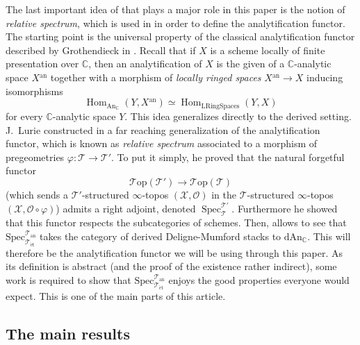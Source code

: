 \documentclass[12pt,a4paper,reqno]{amsart}
\theoremstyle{plain}
\theoremstyle{definition}
\theoremstyle{remark}
\numberwithin{equation}{section}
\begin{document}
The last important idea of \cite{DAG-V} that plays a major role in this paper is the notion of \emph{relative spectrum}, which is used in \cite[Remark 12.26]{DAG-IX} in order to define the analytification functor.
The starting point is the universal property of the classical analytification functor described by Grothendieck in \cite[Expos\'e XII]{SGA1}. Recall that if $X$ is a scheme locally of finite presentation over $\mathbb C$, then an analytification of $X$ is the given of a {$\mathbb C$-analytic\xspace} space $X{^\mathrm{an}}$ together with a morphism of \emph{locally ringed spaces} $X{^\mathrm{an}} \to X$ inducing isomorphisms
\[ \operatorname{Hom}_{{\mathrm{An}_{{\mathbb C}}}}(Y, X{^\mathrm{an}}) \simeq \operatorname{Hom}_{\mathrm{LRingSpaces}}(Y,X)  \]
for every {$\mathbb C$-analytic\xspace} space $Y$.
This idea generalizes directly to the derived setting.
J.\ Lurie constructed in \cite[Theorem 2.1.1]{DAG-V} a far reaching generalization of the analytification functor, which is known as \emph{relative spectrum} associated to a morphism of pregeometries $\varphi \colon {\mathcal T} \to {\mathcal T}'$. To put it simply, he proved that the natural forgetful functor
\[ {\mathcal T\mathrm{op}}({\mathcal T}') \to {\mathcal T\mathrm{op}}({\mathcal T}) \]
(which sends a ${\mathcal T}'$-structured $\infty$-topos $({\mathcal X}, {\mathcal O})$ in the ${\mathcal T}$-structured $\infty$-topos $({\mathcal X}, {\mathcal O} \circ \varphi)$) admits a right adjoint, denoted $\operatorname{Spec}^{{\mathcal T}'}_{\mathcal T}$.
Furthermore he showed that this functor respects the subcategories of schemes.
Then, \cite[Corollary 12.22]{DAG-IX} allows to see that ${\mathrm{Spec}^{{\mathcal T}_{\mathrm{an}}}_{{\mathcal T}_{\mathrm{\acute{e}t}}}}$ takes the category of derived {Deligne-Mumford\xspace} stacks to ${\mathrm{dAn}_{\mathbb C}}$. This will therefore be the analytification functor we will be using through this paper.
As its definition is abstract (and the proof of the existence rather indirect), some work is required to show that ${\mathrm{Spec}^{{\mathcal T}_{\mathrm{an}}}_{{\mathcal T}_{\mathrm{\acute{e}t}}}}$ enjoys the good properties everyone would expect. This is one of the main parts of this article.

\subsection*{The main results}
\end{document}
